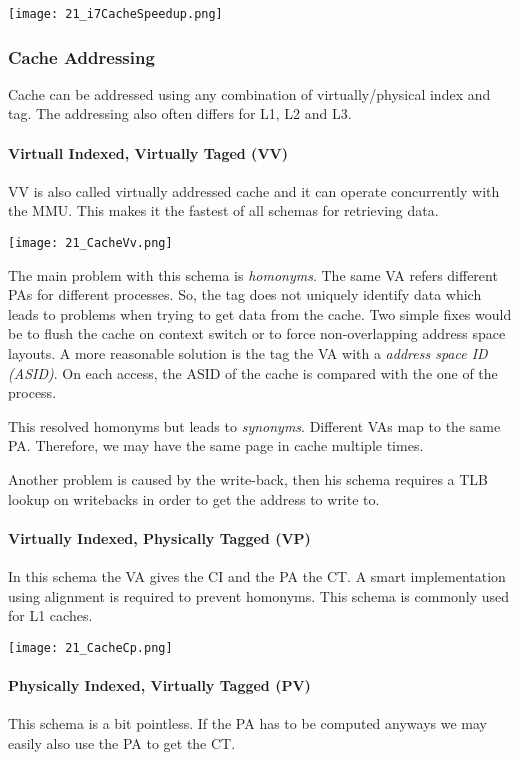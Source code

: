 \texttt{[image: 21\_i7CacheSpeedup.png]}

\subsubsection{Cache Addressing}
Cache can be addressed using any combination of virtually/physical index and tag. The addressing also often differs for L1, L2 and L3.

\paragraph{Virtuall Indexed, Virtually Taged (VV)}
VV is also called virtually addressed cache and it can operate concurrently with the MMU. This makes it the fastest of all schemas for retrieving data.

\texttt{[image: 21\_CacheVv.png]}

The main problem with this schema is \textit{homonyms}. The same VA refers different PAs for different processes. So, the tag does not uniquely identify data which leads to problems when trying to get data from the cache. Two simple fixes would be to flush the cache on context switch or to force non-overlapping address space layouts. A more reasonable solution is the tag the VA with a \textit{address space ID (ASID)}. On each access, the ASID of the cache is compared with the one of the process.

This resolved homonyms but leads to \textit{synonyms}. Different VAs map to the same PA. Therefore, we may have the same page in cache multiple times.

Another problem is caused by the write-back, then his schema requires a TLB lookup on writebacks in order to get the address to write to.

\paragraph{Virtually Indexed, Physically Tagged (VP)}
In this schema the VA gives the CI and the PA the CT. A smart implementation using alignment is required to prevent homonyms. This schema is commonly used for L1 caches.

\texttt{[image: 21\_CacheCp.png]}


\paragraph{Physically Indexed, Virtually Tagged (PV)}
This schema is a bit pointless. If the PA has to be computed anyways we may easily also use the PA to get the CT.

